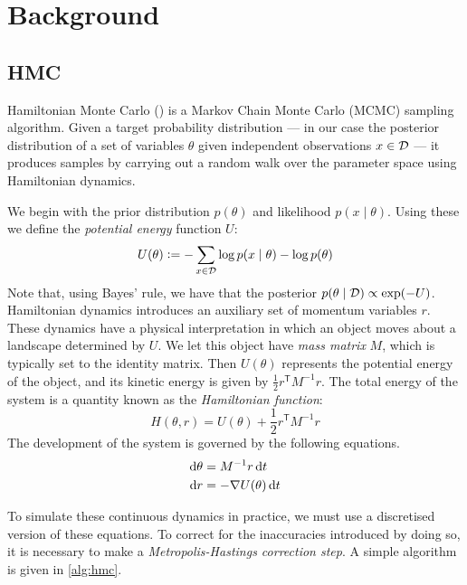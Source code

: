 
\section{Background}

\subsection{HMC}

Hamiltonian Monte Carlo (\cite{duane-hmc,neal-hmc}) is a Markov Chain Monte Carlo (MCMC) sampling algorithm. Given a target probability distribution — in our case the posterior distribution of a set of variables $\theta$ given independent observations $x \in \mathcal{D}$ — it produces samples by carrying out a random walk over the parameter space using Hamiltonian dynamics.

We begin with the prior distribution $p(\theta)$ and likelihood $p(x \mid \theta)$. Using these we define the \emph{potential energy} function $U$:
\begin{equation*}
    U(\theta) \vcentcolon= - \sum_{x \in \mathcal{D}}\log p(x \mid \theta) - \log p(\theta)
\end{equation*}
Note that, using Bayes' rule, we have that the posterior $p(\theta \mid \mathcal{D}) \propto \exp(-U)$. Hamiltonian dynamics introduces an auxiliary set of momentum variables $r$. These dynamics have a physical interpretation in which an object moves about a landscape determined by $U$. We let this object have \emph{mass matrix} $M$, which is typically set to the identity matrix. Then $U(\theta)$ represents the potential energy of the object, and its kinetic energy is given by $\frac 1 2 r^{\mathsf T} M^{-1} r$. The total energy of the system is a quantity known as the \emph{Hamiltonian function}:
\begin{equation*}
    H(\theta, r) = U(\theta) + \frac 1 2 r^{\mathsf T} M^{-1} r
\end{equation*}
The development of the system is governed by the following equations.
\begin{align*}
    \dif\theta &= M^{-1}r \dif t \\
    \dif r &= - \nabla U(\theta) \dif t
\end{align*}

To simulate these continuous dynamics in practice, we must use a discretised version of these equations. To correct for the inaccuracies introduced by doing so, it is necessary to make a \emph{Metropolis-Hastings correction step}. A simple algorithm is given in \cref{alg:hmc}.

